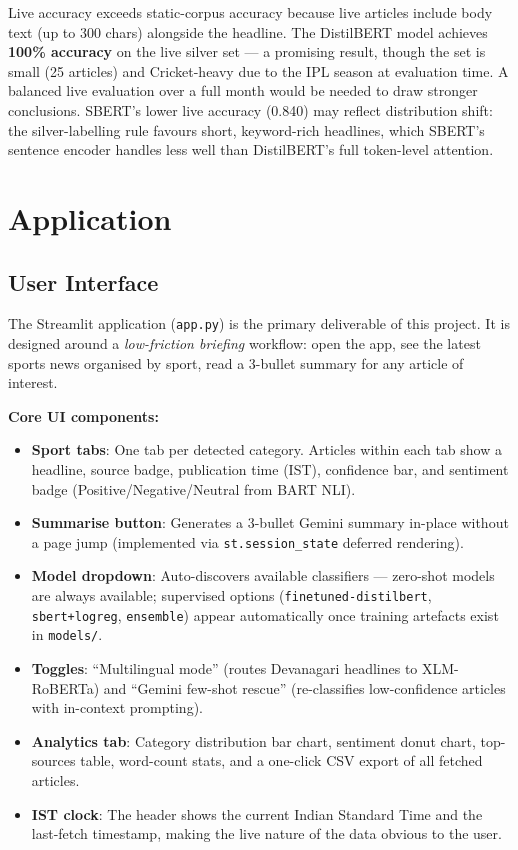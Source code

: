 \documentclass[11pt,a4paper]{article}
\begin{document}
Live accuracy exceeds static-corpus accuracy because live articles include body text (up to 300 chars) alongside the headline. The DistilBERT model achieves \textbf{100\% accuracy} on the live silver set — a promising result, though the set is small (25 articles) and Cricket-heavy due to the IPL season at evaluation time. A balanced live evaluation over a full month would be needed to draw stronger conclusions. SBERT's lower live accuracy (0.840) may reflect distribution shift: the silver-labelling rule favours short, keyword-rich headlines, which SBERT's sentence encoder handles less well than DistilBERT's full token-level attention.

\section{Application}

\subsection{User Interface}

The Streamlit application (\texttt{app.py}) is the primary deliverable of this project. It is designed around a \textit{low-friction briefing} workflow: open the app, see the latest sports news organised by sport, read a 3-bullet summary for any article of interest.

\textbf{Core UI components:}
\begin{itemize}[noitemsep]
  \item \textbf{Sport tabs}: One tab per detected category. Articles within each tab show a headline, source badge, publication time (IST), confidence bar, and sentiment badge (Positive/Negative/Neutral from BART NLI).
  \item \textbf{Summarise button}: Generates a 3-bullet Gemini summary in-place without a page jump (implemented via \texttt{st.session\_state} deferred rendering).
  \item \textbf{Model dropdown}: Auto-discovers available classifiers — zero-shot models are always available; supervised options (\texttt{finetuned-distilbert}, \texttt{sbert+logreg}, \texttt{ensemble}) appear automatically once training artefacts exist in \texttt{models/}.
  \item \textbf{Toggles}: ``Multilingual mode'' (routes Devanagari headlines to XLM-RoBERTa) and ``Gemini few-shot rescue'' (re-classifies low-confidence articles with in-context prompting).
  \item \textbf{Analytics tab}: Category distribution bar chart, sentiment donut chart, top-sources table, word-count stats, and a one-click CSV export of all fetched articles.
  \item \textbf{IST clock}: The header shows the current Indian Standard Time and the last-fetch timestamp, making the live nature of the data obvious to the user.
\end{itemize}
\end{document}
